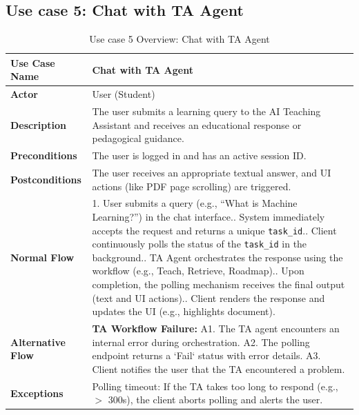 \subsection{Use case 5: Chat with TA Agent}
\begin{table}[H]
    \centering
    \renewcommand{\arraystretch}{1.5}
    \begin{tabularx}{\textwidth}{|l|X|}
        \hline
        \textbf{Use Case Name} & Chat with TA Agent \\
        \hline
        \textbf{Actor} & User (Student) \\
        \hline
        \textbf{Description} & The user submits a learning query to the AI Teaching Assistant and receives an educational response or pedagogical guidance. \\
        \hline
        \textbf{Preconditions} & The user is logged in and has an active session ID. \\
        \hline
        \textbf{Postconditions} & The user receives an appropriate textual answer, and UI actions (like PDF page scrolling) are triggered. \\
        \hline
        \textbf{Normal Flow} & 
        1. User submits a query (e.g., ``What is Machine Learning?'') in the chat interface.\newline
        2. System immediately accepts the request and returns a unique \texttt{task\_id}.\newline
        3. Client continuously polls the status of the \texttt{task\_id} in the background.\newline
        4. TA Agent orchestrates the response using the workflow (e.g., Teach, Retrieve, Roadmap).\newline
        5. Upon completion, the polling mechanism receives the final output (text and UI actions).\newline
        6. Client renders the response and updates the UI (e.g., highlights document). \\
        \hline
        \textbf{Alternative Flow} & 
        \textbf{TA Workflow Failure:}\newline
        A1. The TA agent encounters an internal error during orchestration.\newline
        A2. The polling endpoint returns a `Fail` status with error details.\newline
        A3. Client notifies the user that the TA encountered a problem. \\
        \hline
        \textbf{Exceptions} & Polling timeout: If the TA takes too long to respond (e.g., $>$ 300s), the client aborts polling and alerts the user. \\
        \hline
    \end{tabularx}
    \caption{Use case 5 Overview: Chat with TA Agent}\label{tab:uc5}
\end{table}
